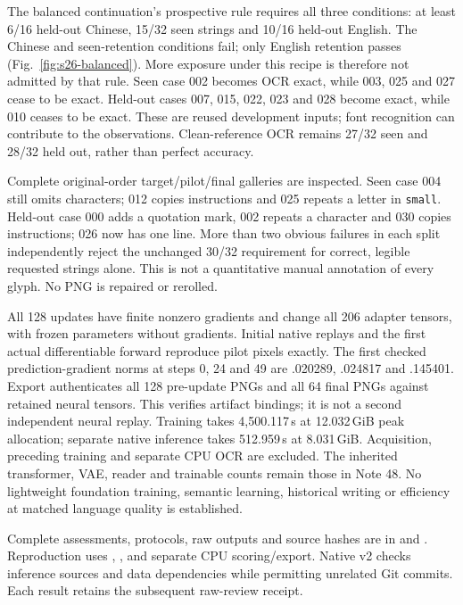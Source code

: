 \documentclass[10pt,a4paper]{article}
\begin{document}
The balanced continuation's prospective rule requires all three conditions:
at least 6/16 held-out Chinese, 15/32 seen strings and 10/16 held-out English.
The Chinese and seen-retention conditions fail; only English retention passes
(Fig.~\ref{fig:s26-balanced}). More exposure under this recipe is therefore
not admitted by that rule. Seen case 002 becomes OCR exact, while 003, 025
and 027 cease to be exact. Held-out cases 007, 015, 022, 023 and 028 become
exact, while 010 ceases to be exact. These are reused development inputs;
font recognition can contribute to the observations. Clean-reference OCR
remains 27/32 seen and 28/32 held out, rather than perfect accuracy.

Complete original-order target/pilot/final galleries are inspected. Seen
case 004 still omits characters; 012 copies instructions and 025 repeats a
letter in \texttt{small}. Held-out case 000 adds a quotation mark, 002 repeats
a character and 030 copies instructions; 026 now has one line. More than
two obvious failures in each split independently reject the unchanged 30/32
requirement for correct, legible requested strings alone. This is not a
quantitative manual annotation of every glyph. No PNG is repaired or rerolled.

All 128 updates have finite nonzero gradients and change all 206 adapter
tensors, with frozen parameters without gradients. Initial native replays
and the first actual differentiable forward reproduce pilot pixels exactly.
The first checked prediction-gradient norms at steps 0, 24 and 49 are .020289,
.024817 and .145401. Export authenticates all 128 pre-update PNGs and all
64 final PNGs against retained neural tensors. This verifies artifact bindings;
it is not a second independent neural replay. Training takes 4,500.117\,s at
12.032\,GiB peak allocation; separate native inference takes 512.959\,s at
8.031\,GiB. Acquisition, preceding training and separate CPU OCR are excluded.
The inherited transformer, VAE, reader and trainable counts remain those in
Note 48. No lightweight foundation training, semantic learning, historical
writing or efficiency at matched language quality is established.

{\footnotesize\raggedright
Complete assessments, protocols, raw outputs and source hashes are in
 and
.
Reproduction uses ,
,
 and separate CPU scoring/export.
Native v2 checks inference sources and data dependencies while permitting
unrelated Git commits. Each result retains the subsequent raw-review receipt.
\par}
\end{document}
